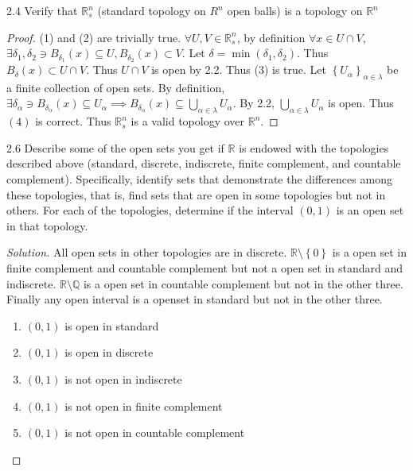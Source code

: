 \documentclass{article}
\newcommand{\R}{\mathbb{R}}
\newcommand{\Q}{\mathbb{Q}}
\newenvironment{solution}
{\renewcommand\qedsymbol{$\blacksquare$}\begin{proof}[Solution]}
{\end{proof}}
\begin{document}
\bigskip

\begin{PROB}{2.4}\label{Problem 2.4.}
    Verify that $\R_{s}^n$ (standard topology on $R^n$ open balls) is a topology on $\R^n$  
\end{PROB}
\begin{proof}
    (1) and (2) are trivially true. $\forall U, V \in \R_s^n$, by definition $\forall x \in U \cap V$, $\exists \delta_1, \delta_2 \ni B_{\delta_1}(x) \subseteq U, B_{\delta_2}(x) \subset V$. Let $\delta = \min(\delta_1, \delta_2)$. Thus $B_\delta(x) \subset U \cap V$. Thus $U \cap V$ is open by 2.2. Thus (3) is true. Let $\left\{ U_\alpha \right\}_{\alpha \in \lambda}$ be a finite collection of open sets. By definition, $\exists \delta_\alpha \ni B_{\delta_\alpha}(x) \subseteq U_\alpha \implies B_{\delta_\alpha}(x) \subseteq \bigcup_{\alpha \in \lambda}U_\alpha$. By 2.2, $\bigcup_{\alpha \in \lambda}U_\alpha$ is open. Thus $(4)$ is correct. Thus $\R_s^n$ is a valid topology over $\R^n$.         
\end{proof}

\bigskip

\begin{PROB}{2.6}\label{Problem 2.6.}
    Describe some of the open sets you get if $\R$  is endowed with the topologies described above (standard, discrete, indiscrete, finite complement, and countable complement). Specifically, identify sets that demonstrate the differences among these topologies, that is, find sets that are open in some topologies but not in others. For each of the topologies, determine if the interval $(0, 1)$ is an open set in that topology.
\end{PROB}
\begin{solution}
    All open sets in other topologies are in discrete. $\R \setminus \left\{ 0 \right\}$ is a open set in finite complement and countable complement but not a open set in standard and indiscrete. $\R \setminus \Q$ is a open set in countable complement but not in the other three. Finally any open interval is a openset in standard but not in the other three.
    
    \begin{enumerate}
        \item $(0, 1)$ is open in standard
        \item $(0, 1)$ is open in discrete
        \item $(0, 1)$ is not open in indiscrete
        \item $(0, 1)$ is not open in finite complement
        \item $(0, 1)$ is not open in countable complement     
    \end{enumerate}
    
\end{solution}
\end{document}
